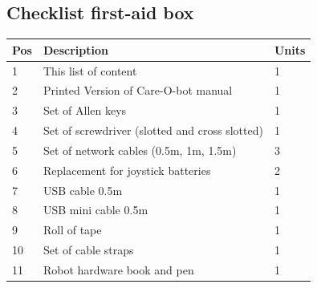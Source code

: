 \subsection{Checklist first-aid box}\label{sec:firstaidbox}

\begin{center}
\begin{tabular}{|l|l|l|}
\hline
\textbf{Pos} & \textbf{Description} & \textbf{Units}\\
\hline\hline
1 & This list of content & 1\\
2 & Printed Version of Care-O-bot manual & 1\\
3 & Set of Allen keys & 1\\
4 & Set of screwdriver (slotted and cross slotted) & 1\\
5 & Set of network cables (0.5m, 1m, 1.5m) & 3\\
6 & Replacement for joystick batteries & 2\\
7 & USB cable 0.5m & 1\\
8 & USB mini cable 0.5m & 1\\
9 & Roll of tape & 1\\
10 & Set of cable straps & 1\\
11 & Robot hardware book and pen & 1\\
\hline
\end{tabular}
\end{center}

\newpage

